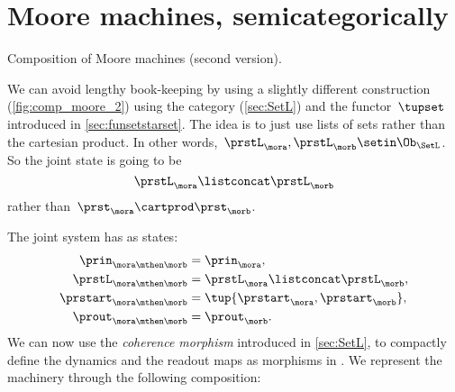 
\section{Moore machines, semicategorically}
\label{sec:moore-semicategorically}

    \begin{marginfigure}
        \centering
        \caption{Composition of Moore machines (second version).}
        \label{fig:comp_moore_2}
    \end{marginfigure}

    We can avoid lengthy book-keeping by using a slightly different construction (\cref{fig:comp_moore_2}) using the \SetL category (\cref{sec:SetL}) and the functor~$\tupset$ introduced in \cref{sec:funsetstarset}.
    The idea is to just use lists of sets rather than the cartesian product.
    In other words,~$\prstL_\mora, \prstL_\morb\setin \Ob_{\SetL}$.
    So the joint state is going to be~
    \begin{equation}
        \label{eq:moore-comp-good-joint}
        \prstL_{\mora} \listconcat   \prstL_{\morb}
    \end{equation}
    rather than~$\prst_{\mora} \cartprod \prst_{\morb}$.

    The joint system has as states:
    \begin{equation}
        \label{eq:moore-comp-good-1}
        \begin{aligned}
            \prin_{\mora\mthen\morb}    & = \prin_{\mora}, \\
            \prstL_{\mora\mthen\morb}   & = \prstL_{\mora}\listconcat  \prstL_{\morb}, \\
            \prstart_{\mora\mthen\morb} & = \tup{\prstart_{\mora},\prstart_{\morb}}, \\
            \prout_{\mora\mthen\morb}   & = \prout_{\morb}.
        \end{aligned}
    \end{equation}
    We can now use the \emph{coherence morphism} introduced in \cref{sec:SetL}, to compactly define the dynamics and the readout maps as morphisms in \Set.
    We represent the machinery through the following composition:

    \begin{widepar}
    \end{widepar}

